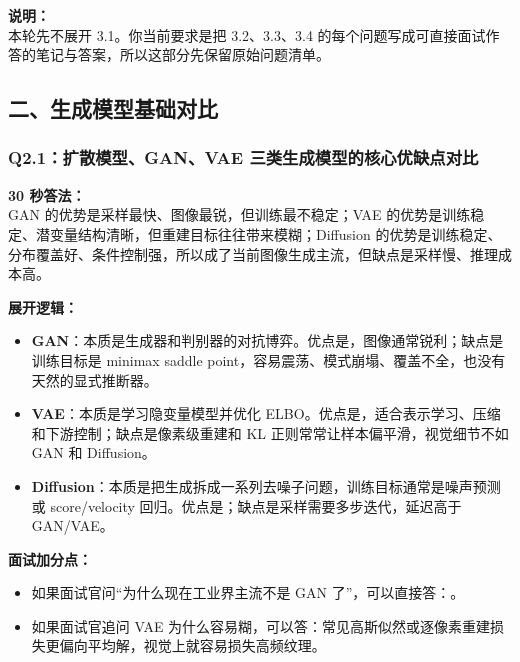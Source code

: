 \begin{summarybox}
\textbf{说明：}\\
本轮先不展开 3.1。你当前要求是把 3.2、3.3、3.4 的每个问题写成可直接面试作答的笔记与答案，所以这部分先保留原始问题清单。
\end{summarybox}

\subsection{二、生成模型基础对比}

\subsubsection{Q2.1：扩散模型、GAN、VAE 三类生成模型的核心优缺点对比}

\begin{conceptbox}
\textbf{30 秒答法：}\\
GAN 的优势是采样最快、图像最锐，但训练最不稳定；VAE 的优势是训练稳定、潜变量结构清晰，但重建目标往往带来模糊；Diffusion 的优势是训练稳定、分布覆盖好、条件控制强，所以成了当前图像生成主流，但缺点是采样慢、推理成本高。
\end{conceptbox}

\textbf{展开逻辑：}
\begin{itemize}[leftmargin=1.5em]
  \item \textbf{GAN}：本质是生成器和判别器的对抗博弈。优点是，图像通常锐利；缺点是训练目标是 minimax saddle point，容易震荡、模式崩塌、覆盖不全，也没有天然的显式推断器。
  \item \textbf{VAE}：本质是学习隐变量模型并优化 ELBO。优点是，适合表示学习、压缩和下游控制；缺点是像素级重建和 KL 正则常常让样本偏平滑，视觉细节不如 GAN 和 Diffusion。
  \item \textbf{Diffusion}：本质是把生成拆成一系列去噪子问题，训练目标通常是噪声预测或 score/velocity 回归。优点是；缺点是采样需要多步迭代，延迟高于 GAN/VAE。
\end{itemize}

\textbf{面试加分点：}
\begin{itemize}[leftmargin=1.5em]
  \item 如果面试官问“为什么现在工业界主流不是 GAN 了”，可以直接答：。
  \item 如果面试官追问 VAE 为什么容易糊，可以答：常见高斯似然或逐像素重建损失更偏向平均解，视觉上就容易损失高频纹理。
\end{itemize}

